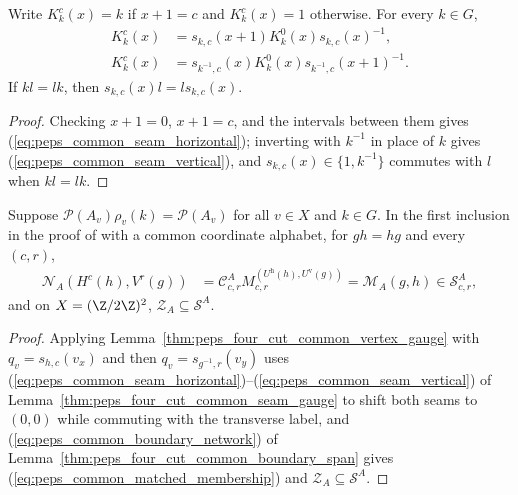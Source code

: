 \begin{lemma}%
    \label{thm:peps_four_cut_common_seam_gauge}
    \leanok
    Write $K^c_k(x)=k$ if $x+1=c$ and $K^c_k(x)=1$ otherwise. For every $k\in G$,
    \begin{align}
        K^c_k(x) & =s_{k,c}(x+1)K^0_k(x)s_{k,c}(x)^{-1},
        \label{eq:peps_common_seam_horizontal}                     \\
        K^c_k(x) & =s_{k^{-1},c}(x)K^0_k(x)s_{k^{-1},c}(x+1)^{-1}.
        \label{eq:peps_common_seam_vertical}
    \end{align}
    If $kl=lk$, then $s_{k,c}(x)l=ls_{k,c}(x)$.
\end{lemma}
\begin{proof}\leanok
    Checking $x+1=0$, $x+1=c$, and the intervals between them gives
    (\ref{eq:peps_common_seam_horizontal}); inverting with $k^{-1}$ in place of
    $k$ gives (\ref{eq:peps_common_seam_vertical}), and $s_{k,c}(x)\in\{1,k^{-1}\}$
    commutes with $l$ when $kl=lk$.
\end{proof}

\begin{lemma}%
    \label{thm:peps_four_cut_common_matched_membership}
    \leanok
    Suppose $\mathcal P(A_v)\rho_v(k)=\mathcal P(A_v)$ for all $v\in X$ and
    $k\in G$. In the first inclusion in the proof of
    \cite[Theorem~5.5]{Schuch2010PEPS} with a common coordinate alphabet, for
    $gh=hg$ and every $(c,r)$,
    \begin{align}
        \mathcal N_A(H^c(h),V^r(g))
         & =\mathcal C^A_{c,r}M^{(U^{\mathrm h}(h),U^{\mathrm v}(g))}_{c,r}
        =\mathcal M_A(g,h)\in\mathcal S^A_{c,r},
        \label{eq:peps_common_matched_membership}
    \end{align}
    and on $X=(\Z/2\Z)^2$, $\mathcal Z_A\subseteq\mathcal S^A$.
\end{lemma}
\begin{proof}\leanok
    Applying Lemma~\ref{thm:peps_four_cut_common_vertex_gauge} with
    $q_v=s_{h,c}(v_x)$ and then $q_v=s_{g^{-1},r}(v_y)$ uses
    (\ref{eq:peps_common_seam_horizontal})--(\ref{eq:peps_common_seam_vertical})
    of Lemma~\ref{thm:peps_four_cut_common_seam_gauge} to shift both seams to
    $(0,0)$ while commuting with the transverse label, and
    (\ref{eq:peps_common_boundary_network}) of
    Lemma~\ref{thm:peps_four_cut_common_boundary_span} gives
    (\ref{eq:peps_common_matched_membership}) and $\mathcal Z_A\subseteq\mathcal S^A$.
\end{proof}
